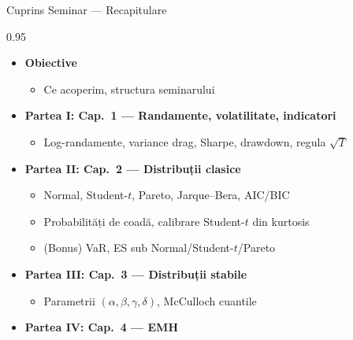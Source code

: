 \documentclass[9pt, aspectratio=169, t]{beamer}
\subtitle{Seminar recapitulare}
\begin{document}
{
\begin{frame}
    \titlepage
\end{frame}
}

\begin{frame}[shrink=25]{Cuprins Seminar --- Recapitulare}
    \begin{cminipage}{0.95\textwidth}
    \begin{itemize}\setlength{\itemsep}{0pt}
        \item \textbf{Obiective}
        \begin{itemize}\setlength{\itemsep}{0pt}
            \item Ce acoperim, structura seminarului
        \end{itemize}
        \item \textbf{Partea I: Cap.~1 --- Randamente, volatilitate, indicatori}
        \begin{itemize}\setlength{\itemsep}{0pt}
            \item Log-randamente, variance drag, Sharpe, drawdown, regula $\sqrt{T}$
        \end{itemize}
        \item \textbf{Partea II: Cap.~2 --- Distribuții clasice}
        \begin{itemize}\setlength{\itemsep}{0pt}
            \item Normal, Student-$t$, Pareto, Jarque--Bera, AIC/BIC
            \item Probabilități de coadă, calibrare Student-$t$ din kurtosis
            \item (Bonus) VaR, ES sub Normal/Student-$t$/Pareto
        \end{itemize}
        \item \textbf{Partea III: Cap.~3 --- Distribuții stabile}
        \begin{itemize}\setlength{\itemsep}{0pt}
            \item Parametrii $(\alpha, \beta, \gamma, \delta)$, McCulloch cuantile
        \end{itemize}
        \item \textbf{Partea IV: Cap.~4 --- EMH}

\end{itemize}
\end{cminipage}
\end{frame}
\end{document}

